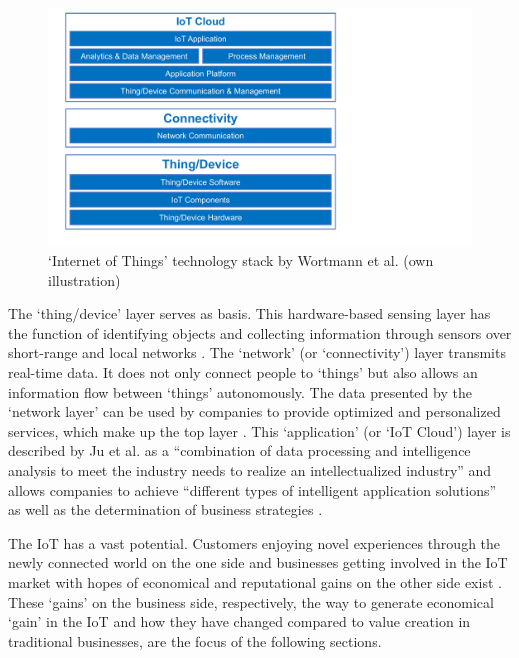 	\begin{figure}[ht]
	    \begin{center}
	    \includegraphics[scale=0.5]{Talk11/wortmann_stack.pdf}
	    \end{center}
	    \caption{`Internet of Things' technology stack by Wortmann et al. \cite{wortmann} (own illustration)}
	    \label{fig:wortmann_stack}
    \end{figure}
	The `thing/device' layer serves as basis. This hardware-based sensing layer has the function of identifying objects and collecting information through sensors over short-range and local networks \cite{ju}. The `network' (or `connectivity') layer transmits real-time data. It does not only connect people to `things' but also allows an information flow between `things' autonomously. The data presented by the `network layer' can be used by companies to provide optimized and personalized services, which make up the top layer \cite{ju}. This `application' (or `IoT Cloud') layer is described by Ju et al. as a ``combination of data processing and intelligence analysis to meet the industry needs to realize an intellectualized industry'' \cite{ju} and allows companies to achieve ``different types of intelligent application solutions'' as well as the determination of business strategies \cite{ju}.

	The IoT has a vast potential. Customers enjoying novel experiences through the newly connected world on the one side and businesses getting involved in the IoT market with hopes of economical and reputational gains on the other side exist \cite{ju}. These `gains' on the business side, respectively, the way to generate economical `gain' in the IoT and how they have changed compared to value creation in traditional businesses, are the focus of the following sections.
	\vspace{-1em}
